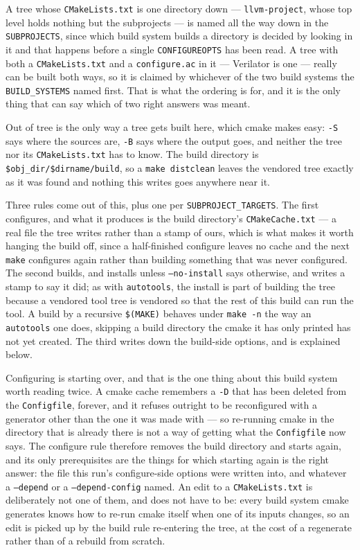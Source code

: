 \documentclass{article}
\begin{document}
A tree whose \texttt{CMakeLists.txt} is one directory down ---
\texttt{llvm-project}, whose top level holds nothing but the
subprojects --- is named all the way down in the
\texttt{SUBPROJECTS}, since which build system builds a directory is
decided by looking in it and that happens before a single
\texttt{CONFIGUREOPTS} has been read.  A tree with both a
\texttt{CMakeLists.txt} and a \texttt{configure.ac} in it --- Verilator
is one --- really can be built both ways, so it is claimed by
whichever of the two build systems the \texttt{BUILD\_SYSTEMS} named
first.  That is what the ordering is for, and it is the only thing
that can say which of two right answers was meant.

Out of tree is the only way a tree gets built here, which cmake makes
easy: \texttt{-S} says where the sources are, \texttt{-B} says where
the output goes, and neither the tree nor its \texttt{CMakeLists.txt}
has to know.  The build directory is
\texttt{\$obj\_dir/\$dirname/build}, so a \texttt{make distclean}
leaves the vendored tree exactly as it was found and nothing this
writes goes anywhere near it.

Three rules come out of this, plus one per
\texttt{SUBPROJECT\_TARGETS}.  The first configures, and what it
produces is the build directory's \texttt{CMakeCache.txt} --- a real
file the tree writes rather than a stamp of ours, which is what makes
it worth hanging the build off, since a half-finished configure leaves
no cache and the next \texttt{make} configures again rather than
building something that was never configured.  The second builds, and
installs unless \texttt{--no-install} says otherwise, and writes a
stamp to say it did; as with \texttt{autotools}, the install is part
of building the tree because a vendored tool tree is vendored so that
the rest of this build can run the tool.  A build by a recursive
\texttt{\$(MAKE)} behaves under \texttt{make -n} the way an
\texttt{autotools} one does, skipping a build directory the cmake it
has only printed has not yet created.  The third writes down the
build-side options, and is explained below.

Configuring is starting over, and that is the one thing about this
build system worth reading twice.  A cmake cache remembers a
\texttt{-D} that has been deleted from the \texttt{Configfile},
forever, and it refuses outright to be reconfigured with a generator
other than the one it was made with --- so re-running cmake in the
directory that is already there is not a way of getting what the
\texttt{Configfile} now says.  The configure rule therefore removes
the build directory and starts again, and its only prerequisites are
the things for which starting again is the right answer: the file this
run's configure-side options were written into, and whatever a
\texttt{--depend} or a \texttt{--depend-config} named.  An edit to a
\texttt{CMakeLists.txt} is deliberately not one of them, and does not
have to be: every build system cmake generates knows how to re-run
cmake itself when one of its inputs changes, so an edit is picked up
by the build rule re-entering the tree, at the cost of a regenerate
rather than of a rebuild from scratch.
\end{document}
